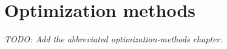 \chapter{Optimization methods}\label{chap:optimization-methods}

\emph{TODO: Add the abbreviated optimization-methods chapter.}
